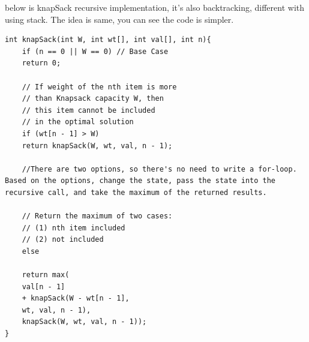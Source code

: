 \documentclass[a4paper,11pt,twoside]{book}
\begin{document}
\par below is knapSack recursive implementation, it's also backtracking, different with using stack. The idea is same, you can see the code is simpler. 
\begin{lstlisting}
int knapSack(int W, int wt[], int val[], int n){
	if (n == 0 || W == 0) // Base Case
	return 0;
	
	// If weight of the nth item is more
	// than Knapsack capacity W, then
	// this item cannot be included
	// in the optimal solution
	if (wt[n - 1] > W)
	return knapSack(W, wt, val, n - 1);
	
	//There are two options, so there's no need to write a for-loop. Based on the options, change the state, pass the state into the recursive call, and take the maximum of the returned results.
	
	// Return the maximum of two cases:
	// (1) nth item included
	// (2) not included
	else
	
	return max(
	val[n - 1]
	+ knapSack(W - wt[n - 1], 
	wt, val, n - 1),
	knapSack(W, wt, val, n - 1));
}			
\end{lstlisting}	
	  
\end{document}
